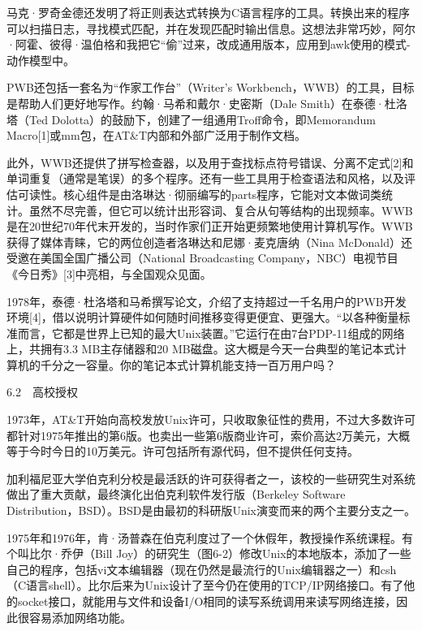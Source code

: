 \documentclass[a4paper,12pt,UTF8,twoside]{ctexbook}
\begin{document}
马克·罗奇金德还发明了将正则表达式转换为C语言程序的工具。转换出来的程序可以扫描日志，寻找模式匹配，并在发现匹配时输出信息。这想法非常巧妙，阿尔·阿霍、彼得·温伯格和我把它“偷”过来，改成通用版本，应用到awk使用的模式-动作模型中。

PWB还包括一套名为“作家工作台”（Writer’s Workbench，WWB）的工具，目标是帮助人们更好地写作。约翰·马希和戴尔·史密斯（Dale Smith）在泰德·杜洛塔（Ted Dolotta）的鼓励下，创建了一组通用Troff命令，即Memorandum Macro[1]或mm包，在AT\&T内部和外部广泛用于制作文档。

此外，WWB还提供了拼写检查器，以及用于查找标点符号错误、分离不定式[2]和单词重复（通常是笔误）的多个程序。还有一些工具用于检查语法和风格，以及评估可读性。核心组件是由洛琳达·彻丽编写的parts程序，它能对文本做词类统计。虽然不尽完善，但它可以统计出形容词、复合从句等结构的出现频率。WWB是在20世纪70年代末开发的，当时作家们正开始更频繁地使用计算机写作。WWB获得了媒体青睐，它的两位创造者洛琳达和尼娜·麦克唐纳（Nina McDonald）还受邀在美国全国广播公司（National Broadcasting Company，NBC）电视节目《今日秀》[3]中亮相，与全国观众见面。

1978年，泰德·杜洛塔和马希撰写论文，介绍了支持超过一千名用户的PWB开发环境[4]，借以说明计算硬件如何随时间推移变得更便宜、更强大。“以各种衡量标准而言，它都是世界上已知的最大Unix装置。”它运行在由7台PDP-11组成的网络上，共拥有3.3 MB主存储器和20 MB磁盘。这大概是今天一台典型的笔记本式计算机的千分之一容量。你的笔记本式计算机能支持一百万用户吗？





6.2　高校授权


1973年，AT\&T开始向高校发放Unix许可，只收取象征性的费用，不过大多数许可都针对1975年推出的第6版。也卖出一些第6版商业许可，索价高达2万美元，大概等于今时今日的10万美元。许可包括所有源代码，但不提供任何支持。

加利福尼亚大学伯克利分校是最活跃的许可获得者之一，该校的一些研究生对系统做出了重大贡献，最终演化出伯克利软件发行版（Berkeley Software Distribution，BSD）。BSD是由最初的科研版Unix演变而来的两个主要分支之一。

1975年和1976年，肯·汤普森在伯克利度过了一个休假年，教授操作系统课程。有个叫比尔·乔伊（Bill Joy）的研究生（图6-2）修改Unix的本地版本，添加了一些自己的程序，包括vi文本编辑器（现在仍然是最流行的Unix编辑器之一）和csh（C语言shell）。比尔后来为Unix设计了至今仍在使用的TCP/IP网络接口。有了他的socket接口，就能用与文件和设备I/O相同的读写系统调用来读写网络连接，因此很容易添加网络功能。
\end{document}
